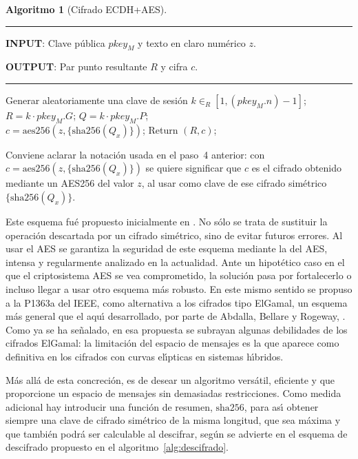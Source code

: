 \documentclass{cedi}%
\def\ces{curvas{} el\'{\i}pticas}%
\theoremstyle{plain}        			%
\theoremstyle{definition}   			%
\theoremstyle{saltolinea}   			%
\newtheorem{algo}{Algoritmo}
\begin{document}
\begin{algo}[Cifrado ECDH+AES]\label{alg:AES}
\parbox[b]{\linewidth}{%
\hrule
\smallskip
{\bf INPUT}: Clave p\'ublica $pkey_{M}$ y texto en claro num\'erico $z$.

{\bf OUTPUT}: Par punto resultante $R$ y cifra $c$.
\vspace{1.5mm}
\hrule
}%
\begin{algorithmic}[1]
\STATE Generar aleatoriamente una clave de sesi\'on $k\in_{R}\left[1,\left(pkey_{M}.n\right)-1\right]$;
\STATE $R=k\cdot pkey_{M}.G$;
\STATE $Q=k\cdot pkey_{M}.P$; \\
\STATE $c=\textrm{aes256}(z,\{\textrm{sha256}(Q_x)\})$;
\STATE Return $(R,c)$;
\end{algorithmic}
\end{algo}

Conviene aclarar la notaci\'on usada en el paso~4 anterior: con $c=\textrm{aes256}(z,\{\textrm{sha256}(Q_x)\})$ se quiere significar que $c$ es el cifrado obtenido mediante un AES256 del valor $z$, al usar como clave de ese cifrado sim\'etrico $\{\textrm{sha256}(Q_x)\}$.

Este esquema fu\'e propuesto inicialmente en \cite{MMR}. No s\'olo se trata de sustituir la operaci\'on descartada por un cifrado sim\'etrico, sino de evitar futuros errores. Al usar el AES se garantiza la seguridad de este esquema mediante la del AES, intensa y regularmente analizado en la actualidad. Ante un hipot\'etico caso en el que el criptosistema AES se vea comprometido, la soluci\'on pasa por fortalecerlo o incluso llegar a usar otro esquema m\'as robusto. En este mismo sentido se propuso a la P1363a del IEEE, como alternativa a los cifrados tipo ElGamal, un esquema m\'as general que el aqu\'{\i} desarrollado, por parte de Abdalla, Bellare y Rogeway, \cite{DHAES}. Como ya se ha se\~nalado, en esa propuesta se subrayan algunas debilidades de los cifrados ElGamal: la limitaci\'on del espacio de mensajes es la que aparece como definitiva en los cifrados con \ces{} en sistemas h\'{\i}bridos.

M\'as all\'a de esta concreci\'on, es de desear un algoritmo vers\'atil, eficiente y que proporcione un espacio de mensajes sin demasiadas restricciones. Como medida adicional hay introducir una funci\'on de resumen, $\textrm{sha256}$, para as\'{\i} obtener siempre una clave de cifrado sim\'etrico de la misma longitud, que sea m\'axima y que tambi\'en podr\'a ser calculable al descifrar, seg\'un se advierte en el esquema de descifrado propuesto en el algoritmo~\ref{alg:descifrado}.
\end{document}
